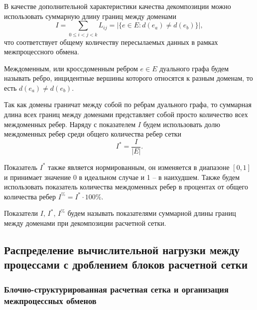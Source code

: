В качестве дополнительной характеристики качества декомпозиции можно использовать суммарную длину границ между доменами
\begin{equation}
	I = \sum_{0 \le i < j < k}{L_{ij}} = |\{ e \in E : d(e_a) \ne d(e_b) \}|,
\end{equation}
что соответствует общему количеству пересылаемых данных в рамках межпроцессного обмена.

\begin{definition}
Междоменным, или кроссдоменным ребром $e \in E$ дуального графа будем называть ребро, инцидентные вершины которого относятся к разным доменам, то есть $d(e_a) \ne d(e_b)$.
\end{definition}

Так как домены граничат между собой по ребрам дуального графа, то суммарная длина всех границ между доменами представляет собой просто количество всех междоменных ребер.
Наряду с показателем $I$ будем использовать долю междоменных ребер среди общего количества ребер сетки
\begin{equation}
	I^{*} = \frac{I}{|E|}.
\end{equation}

Показатель $I^{*}$ также является нормированным, он изменяется в диапазоне $[0, 1]$ и принимает значение 0 в идеальном случае и 1 -- в наихудшем.
Также будем использовать показатель количества междоменных ребер в процентах от общего количества ребер $I^{\%} = I^{*} \cdot 100\%$.

\begin{definition}
Показатели $I$, $I^{*}$, $I^{\%}$ будем называть показателями суммарной длины границ между доменами при декомпозиции расчетной сетки.
\end{definition}


\subsection{Распределение вычислительной нагрузки между \mbox{процессами} с дроблением блоков расчетной сетки}

\subsubsection{Блочно-структурированная расчетная сетка и организация межпроцессных обменов}\label{sec:par_block_struct_mesh}

